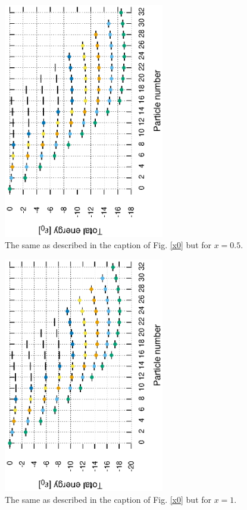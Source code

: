 \documentclass[11pt]{book} %
\begin{document}
\begin{figure}[htbp]
 \begin{center}
  \includegraphics[width=70mm,angle=-90]{images/spectra_x0p5.eps}
 \end{center}
 \caption{The same as described in the caption of Fig. \ref{x0} but for $x=0.5$.
	}
 \label{x0p5}
\end{figure}

\begin{figure}[htbp]
 \begin{center}
  \includegraphics[width=70mm,angle=-90]{images/spectra_x1.eps}
 \end{center}
 \caption{The same as described in the caption of Fig. \ref{x0} but for $x=1$.
	}
 \label{x1}
\end{figure}
\end{document}
